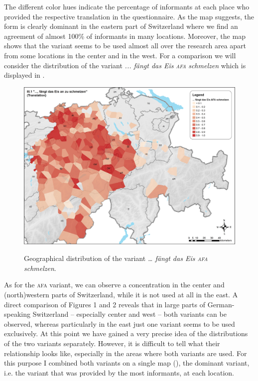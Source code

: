 \documentclass[output=paper]{LSP/langsci}
\begin{document}
The different color hues indicate the percentage of informants at each place who provided the respective translation in the questionnaire. As the map suggests, the form is clearly dominant in the eastern part of Switzerland where we find an agreement of almost 100\% of informants in many locations. Moreover, the map shows that the variant seems to be used almost all over the research area apart from some locations in the center and in the west. For a comparison we will consider the distribution of the variant \emph{... fängt das Eis }\emph{\textsc{afa}}\emph{ schmelzen} which is displayed in .

  
\begin{figure}
\includegraphics[width=\textwidth]{illustrations/stoeck_fig2}
\label{fig:2}
\caption{Geographical distribution of the variant \emph{… fängt das Eis \textsc{afa} schmelzen}.}
\end{figure}
 
As for the \textsc{afa} variant, we can observe a concentration in the center and (north)western parts of Switzerland, while it is not used at all in the east. A direct comparison of Figures 1 and 2 reveals that in large parts of German-speaking Switzerland – especially center and west – both variants can be observed, whereas particularly in the east just one variant seems to be used exclusively. At this point we have gained a very precise idea of the distributions of the two variants separately. However, it is difficult to tell what their relationship looks like, especially in the areas where both variants are used. For this purpose I combined both variants on a single map (), the dominant variant, i.e. the variant that was provided by the most informants, at each location.
 
\end{document}
